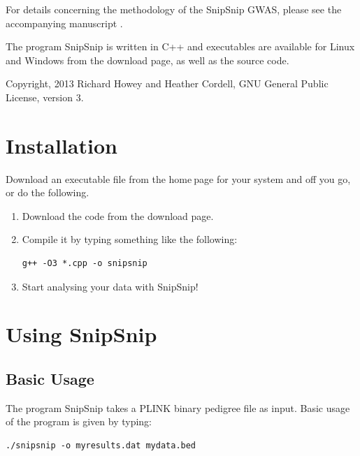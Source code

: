 \documentclass[a4paper,12pt]{article}
\begin{document}
For details concerning the methodology of the SnipSnip GWAS, please see the accompanying manuscript \citet{howey:etal:14}. 

The program SnipSnip is written in C++ and executables are available for Linux and Windows from the download page, as well as the source code. 

Copyright, 2013 Richard Howey and Heather Cordell, GNU General Public License, version 3. 




\section{Installation}
\label{installation}

Download an executable file from the home$\:$page for your system and off you go, or do the following. 
\begin{enumerate}

\item Download the code from the download page. 
\item Compile it by typing something like the following: \begin{verbatim}g++ -O3 *.cpp -o snipsnip \end{verbatim}

\item Start analysing your data with SnipSnip!\end{enumerate}


\section{Using SnipSnip}
\label{using}
\subsection{Basic Usage}
\label{basic-usage}

The program SnipSnip takes a PLINK binary pedigree file as input. Basic usage of the program is given by typing: 
\begin{verbatim}
./snipsnip -o myresults.dat mydata.bed
\end{verbatim}

\end{document}
